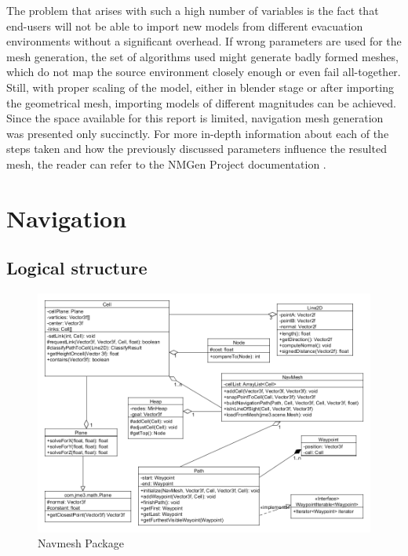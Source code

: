 The problem that arises with such a high number of variables is the fact that end-users will not be able to import new models from different evacuation environments without a significant overhead. If wrong parameters are used for the mesh generation, the set of algorithms used might generate badly formed meshes, which do not map the source environment closely enough or even fail all-together.
Still, with proper scaling of the model, either in blender stage or after importing the geometrical mesh, importing models of different magnitudes can be achieved.
Since the space available for this report is limited, navigation mesh generation was presented only succinctly. For more in-depth information about each of the steps taken and how the previously discussed parameters influence the resulted mesh, the reader can refer to the NMGen Project documentation \cite{NMGen}.
\section{Navigation}

\subsection{Logical structure}

\begin{figure}[H]
	\centering
	\includegraphics[width=1\textwidth]{../images/navmesh.png}
	\caption{Navmesh Package}
	\label{fig:navmesh_package}
\end{figure}

